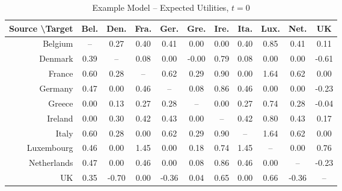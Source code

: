 \begin{table}
\centering
    \caption[Example Model -- Expected Utilities]{Example Model -- Expected Utilities, $t=0$}
    \label{table:eg_eu}
    \begin{tabular}{r|cccccccccc}

        Source  \textbackslash Target &  Bel. &  Den. &  Fra. &  Ger. &  Gre. &  Ire. &  Ita. &  Lux. &  Net. &    UK \\
        \hline
        Belgium     &      -- &     0.27 &    0.40 &     0.41 &    0.00 &     0.00 &   0.40 &        0.85 &         0.41 &  0.11 \\
        Denmark     &     0.39 &      -- &    0.08 &     0.00 &   -0.00 &     0.79 &   0.08 &        0.00 &         0.00 & -0.61 \\
        France      &     0.60 &     0.28 &     -- &     0.62 &    0.29 &     0.90 &   0.00 &        1.64 &         0.62 &  0.00 \\
        Germany     &     0.47 &     0.00 &    0.46 &      -- &    0.08 &     0.86 &   0.46 &        0.00 &         0.00 & -0.23 \\
        Greece      &     0.00 &     0.13 &    0.27 &     0.28 &     -- &     0.00 &   0.27 &        0.74 &         0.28 & -0.04 \\
        Ireland     &     0.00 &     0.30 &    0.42 &     0.43 &    0.00 &      -- &   0.42 &        0.80 &         0.43 &  0.17 \\
        Italy       &     0.60 &     0.28 &    0.00 &     0.62 &    0.29 &     0.90 &    -- &        1.64 &         0.62 &  0.00 \\
        Luxembourg  &     0.46 &     0.00 &    1.45 &     0.00 &    0.18 &     0.74 &   1.45 &         -- &         0.00 &  0.76 \\
        Netherlands &     0.47 &     0.00 &    0.46 &     0.00 &    0.08 &     0.86 &   0.46 &        0.00 &          -- & -0.23 \\
        UK          &     0.35 &    -0.70 &    0.00 &    -0.36 &    0.04 &     0.65 &   0.00 &        0.66 &        -0.36 &   -- \\
    \end{tabular}
    \tableSpace
\end{table}

